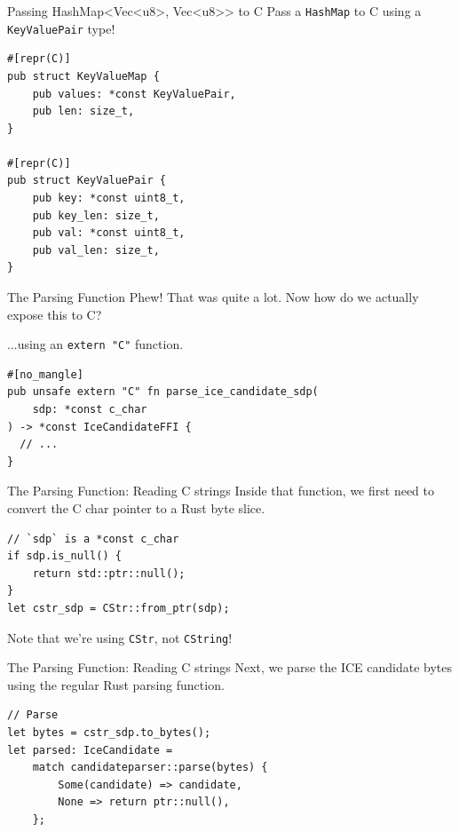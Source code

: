 \documentclass[aspectratio=1610,14pt,t]{beamer}
\begin{document}
\begin{frame}[c,fragile]{Passing HashMap<Vec<u8>, Vec<u8>{}> to C}
  Pass a \texttt{HashMap} to C using a \texttt{KeyValuePair} type!

  \begin{verbatim}
#[repr(C)]
pub struct KeyValueMap {
    pub values: *const KeyValuePair,
    pub len: size_t,
}

#[repr(C)]
pub struct KeyValuePair {
    pub key: *const uint8_t,
    pub key_len: size_t,
    pub val: *const uint8_t,
    pub val_len: size_t,
}
  \end{verbatim}
\end{frame}

\begin{frame}[c,fragile]{The Parsing Function}
  Phew! That was quite a lot. Now how do we actually expose this to C?

  ...using an \texttt{extern "C"} function.

  \begin{verbatim}
#[no_mangle]
pub unsafe extern "C" fn parse_ice_candidate_sdp(
    sdp: *const c_char
) -> *const IceCandidateFFI {
  // ...
}
  \end{verbatim}
\end{frame}

\begin{frame}[c,fragile]{The Parsing Function: Reading C strings}
  Inside that function, we first need to convert the C char pointer to a Rust
  byte slice.

  \begin{verbatim}
// `sdp` is a *const c_char
if sdp.is_null() {
    return std::ptr::null();
}
let cstr_sdp = CStr::from_ptr(sdp);
  \end{verbatim}

Note that we're using \texttt{CStr}, not \texttt{CString}!
\end{frame}

\begin{frame}[c,fragile]{The Parsing Function: Reading C strings}
Next, we parse the ICE candidate bytes using the regular Rust parsing function.

  \begin{verbatim}
// Parse
let bytes = cstr_sdp.to_bytes();
let parsed: IceCandidate =
    match candidateparser::parse(bytes) {
        Some(candidate) => candidate,
        None => return ptr::null(),
    };
  \end{verbatim}
\end{frame}
\end{document}
